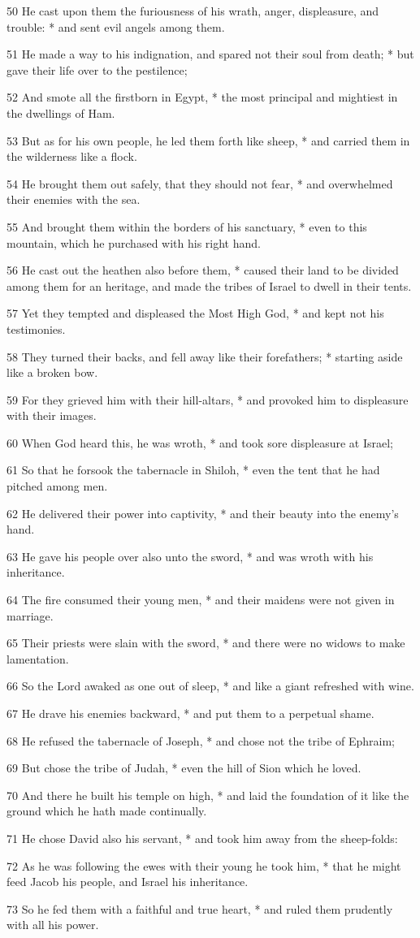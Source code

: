 50 He cast upon them the furiousness of his wrath, anger, displeasure, and trouble: * and sent evil angels among them.\par
51 He made a way to his indignation, and spared not their soul from death; * but gave their life over to the pestilence;\par
52 And smote all the firstborn in Egypt, * the most principal and mightiest in the dwellings of Ham.\par
53 But as for his own people, he led them forth like sheep, * and carried them in the wilderness like a flock.\par
54 He brought them out safely, that they should not fear, * and overwhelmed their enemies with the sea.\par
55 And brought them within the borders of his sanctuary, * even to this mountain, which he purchased with his right hand.\par
56 He cast out the heathen also before them, * caused their land to be divided among them for an heritage, and made the tribes of Israel to dwell in their tents.\par
57 Yet they tempted and displeased the Most High God, * and kept not his testimonies.\par
58 They turned their backs, and fell away like their forefathers; * starting aside like a broken bow.\par
59 For they grieved him with their hill-altars, * and provoked him to displeasure with their images.\par
60 When God heard this, he was wroth, * and took sore displeasure at Israel;\par
61 So that he forsook the tabernacle in Shiloh, * even the tent that he had pitched among men.\par
62 He delivered their power into captivity, * and their beauty into the enemy's hand.\par
63 He gave his people over also unto the sword, * and was wroth with his inheritance.\par
64 The fire consumed their young men, * and their maidens were not given in marriage.\par
65 Their priests were slain with the sword, * and there were no widows to make lamentation.\par
66 So the Lord awaked as one out of sleep, * and like a giant refreshed with wine.\par
67 He drave his enemies backward, * and put them to a perpetual shame.\par
68 He refused the tabernacle of Joseph, * and chose not the tribe of Ephraim;\par
69 But chose the tribe of Judah, * even the hill of Sion which he loved.\par
70 And there he built his temple on high, * and laid the foundation of it like the ground which he hath made continually.\par
71 He chose David also his servant, * and took him away from the sheep-folds:\par
72 As he was following the ewes with their young he took him, * that he might feed Jacob his people, and Israel his inheritance.\par
73 So he fed them with a faithful and true heart, * and ruled them prudently with all his power.
